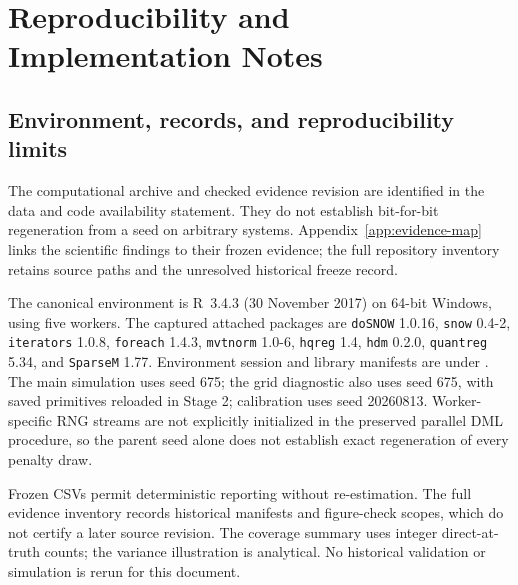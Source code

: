 \clearpage
\section{Reproducibility and Implementation Notes}
\label{app:reproducibility}
\setcounter{equation}{0}\setcounter{table}{0}\setcounter{figure}{0}
\subsection{Environment, records, and reproducibility limits}
The computational archive and checked evidence revision are identified in the data and code availability statement. They do not establish bit-for-bit regeneration from a seed on arbitrary systems. Appendix~\ref{app:evidence-map} links the scientific findings to their frozen evidence; the full repository inventory retains source paths and the unresolved historical freeze record.

The canonical environment is R~3.4.3 (30 November 2017) on 64-bit Windows, using five workers. The captured attached packages are \texttt{doSNOW} 1.0.16, \texttt{snow} 0.4-2, \texttt{iterators} 1.0.8, \texttt{foreach} 1.4.3, \texttt{mvtnorm} 1.0-6, \texttt{hqreg} 1.4, \texttt{hdm} 0.2.0, \texttt{quantreg} 5.34, and \texttt{SparseM} 1.77. Environment session and library manifests are under . The main simulation uses seed 675; the grid diagnostic also uses seed 675, with saved primitives reloaded in Stage 2; calibration uses seed 20260813. Worker-specific RNG streams are not explicitly initialized in the preserved parallel DML procedure, so the parent seed alone does not establish exact regeneration of every penalty draw.

Frozen CSVs permit deterministic reporting without re-estimation. The full evidence inventory records historical manifests and figure-check scopes, which do not certify a later source revision. The coverage summary uses integer direct-at-truth counts; the variance illustration is analytical. No historical validation or simulation is rerun for this document.

